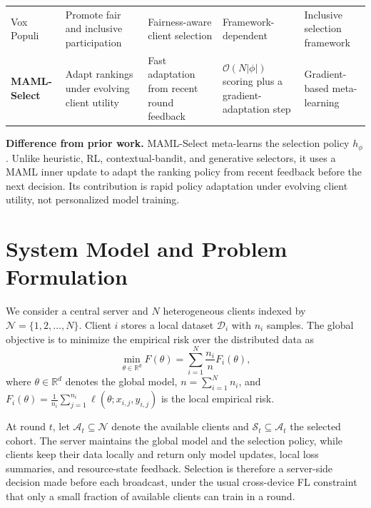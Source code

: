 \documentclass[journal]{IEEEtran}
\newcommand{\revision}[1]{#1}
\begin{document}
\begin{table}[!t]
\begin{tabularx}{\textwidth}{lXXXX}
        Vox Populi~\cite{arisdakessian2026vox} & Promote fair and inclusive participation & Fairness-aware client selection & Framework-dependent & Inclusive selection framework \\
        \textbf{MAML-Select} & Adapt rankings under evolving client utility & Fast adaptation from recent round feedback & $\mathcal{O}(N|\phi|)$ scoring plus a gradient-adaptation step & Gradient-based meta-learning \\
        \bottomrule
    \end{tabularx}
\end{table}

\revision{\textbf{Difference from prior work.} MAML-Select meta-learns the selection policy $h_\phi$. Unlike heuristic, RL, contextual-bandit, and generative selectors, it uses a MAML inner update to adapt the ranking policy from recent feedback before the next decision. Its contribution is rapid policy adaptation under evolving client utility, not personalized model training.}

\section{System Model and Problem Formulation}
\revision{We consider a central server and $N$ heterogeneous clients indexed by $\mathcal{N} = \{1, 2, \ldots, N\}$. Client $i$ stores a local dataset $\mathcal{D}_i$ with $n_i$ samples.} The global objective is to minimize the empirical risk over the distributed data as
\begin{equation}
	\min_{\theta \in \mathbb{R}^d} F(\theta) = \sum_{i=1}^{N} \frac{n_i}{n} F_i(\theta),
	\label{eq:global_objective}
\end{equation}
\revision{where $\theta \in \mathbb{R}^d$ denotes the global model, $n = \sum_{i=1}^{N} n_i$, and $F_i(\theta) = \frac{1}{n_i} \sum_{j=1}^{n_i} \ell(\theta; x_{i,j}, y_{i,j})$ is the local empirical risk.}

\revision{At round $t$, let $\mathcal{A}_t \subseteq \mathcal{N}$ denote the available clients and $\mathcal{S}_t \subseteq \mathcal{A}_t$ the selected cohort. The server maintains the global model and the selection policy, while clients keep their data locally and return only model updates, local loss summaries, and resource-state feedback. Selection is therefore a server-side decision made before each broadcast, under the usual cross-device FL constraint that only a small fraction of available clients can train in a round.}
\end{document}
